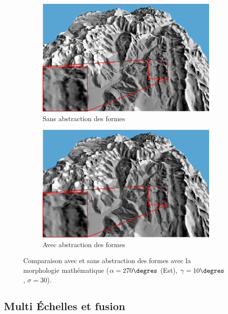 \begin{figure}[h!]
\centering
 \begin{subfigure}[t]{0.47\textwidth}
 \centering
 \includegraphics[width=1.0\linewidth]{Solution/sansMorpho.png}
 \caption{Sans abstraction des formes}
 \end{subfigure}
 \begin{subfigure}[t]{0.47\textwidth}
 \centering
 \includegraphics[width=1.0\linewidth]{Solution/avecMorpho.png}
 \caption{Avec abstraction des formes}
 \end{subfigure}
 \caption{\label{fig:comparaisonMorpho} Comparaison avec et sans abstraction des formes avec la morphologie mathématique ($\alpha =  270\degres$ (Est), $\gamma = 10\degres$ , $\sigma = 30$).}
\end{figure}
\clearpage
\subsection{Multi Échelles et fusion}

